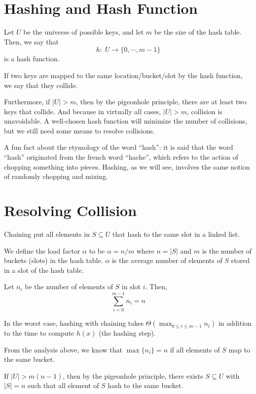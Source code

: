 \section{Hashing and Hash Function}

Let $U$ be the universe of possible keys, and let $m$ be the size of the hash table. Then, we say that
$$
h:\; U \to \{0, \cdots, m-1 \}
$$
is a hash function.

If two keys are mapped to the same location/bucket/slot by the hash function, we say that they collide.

Furthermore, if $|U| > m$, then by the pigeonhole principle, there are at least two keys that collide. And because in virtually all cases, $|U| > m$, collision is unavoidable. A well-chosen hash function will minimize the number of collisions, but we still need some means to resolve collisions.

\begin{remark}
    A fun fact about the etymology of the word ``hash'': it is said that the word ``hash'' originated from the french word ``hache'', which refers to the action of chopping something into pieces. Hashing, as we will see, involves the same notion of randomly chopping and mixing.
\end{remark}

\section{Resolving Collision}

Chaining put all elements in $S \subseteq U$ that hash to the same slot in a linked list.

We define the load factor $\alpha$ to be $\alpha = n/m$ where $n = |S|$ and $m$ is the number of buckets (slots) in the hash table. $\alpha$ is the average number of elements of $S$ stored in a slot of the hash table.

Let $n_i$ be the number of elements of $S$ in slot $i$. Then,
$$
\sum_{i=0}^{m-1} n_i = n
$$

In the worst case, hashing with chaining takes $\Theta(\max_{0 \leq i \leq m-1} n_i)$ in addition to the time to compute $h(x)$ (the hashing step).

From the analysis above, we know that $\max\{n_i\} = n$ if all elements of $S$ map to the same bucket.

If $|U| > m(n-1)$, then by the pigeonhole principle, there exists $S \subseteq U$ with $|S|=n$ such that all element of $S$ hash to the same bucket.

